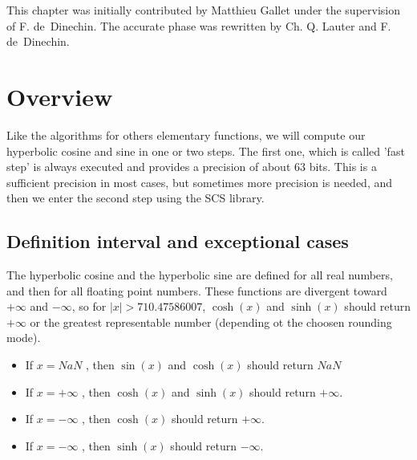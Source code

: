 %
%
%
%


This chapter was initially contributed by Matthieu Gallet under the
supervision of F. de~Dinechin. The accurate phase was rewritten by Ch.
Q. Lauter and F. de~Dinechin.


\section{Overview}

Like the algorithms for others elementary functions, we will compute
our hyperbolic cosine and sine in one or two steps.  The first one,
which is called 'fast step' is always executed and provides a
precision of about 63 bits.  This is a sufficient precision in most
cases, but sometimes more precision is needed, and then we enter the
second step using the SCS library. 



\subsection{Definition interval and exceptional cases}
The hyperbolic cosine and the hyperbolic sine are defined for all real
numbers, and then for all floating point numbers.  These functions are
divergent toward $+\infty$ and $-\infty$, so for $|x| > 710.47586007$,
$\cosh(x)$ and $\sinh(x)$ should return $+\infty$ or the greatest
representable number (depending ot the choosen rounding mode).

\begin{itemize}
\item If $x = NaN$ , then $\sin(x)$ and $\cosh(x)$ should return $NaN$
\item If $x = +\infty$ , then $\cosh(x)$ and $\sinh(x)$ should return $+\infty$. 
\item If $x = -\infty$ , then $\cosh(x)$ should return $+\infty$. 
\item If $x = -\infty$ , then $\sinh(x)$ should return $-\infty$. 
\end{itemize}

